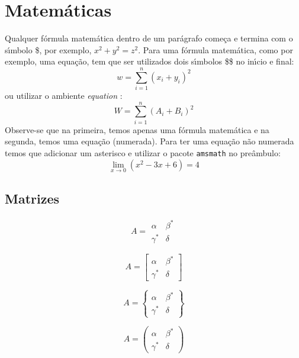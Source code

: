 




\section{Matem\'{a}ticas}
Qualquer f\'{o}rmula matem\'{a}tica dentro de um par\'{a}grafo come\c{c}a e termina com o s\'{\i}mbolo \$, por exemplo, $ x^2 + y^2 = z^2$. Para uma f\'{o}rmula matem\'{a}tica, como por exemplo, uma equa\c{c}\~{a}o, tem que ser utilizados dois s\'{\i}mbolos \$\$ no in\'{\i}cio e final:
$$
  w = \sum_{i=1}^{n} (x_{i}+y_{i})^{2}
$$
ou utilizar o ambiente \textit{equation}  :
\begin{equation}
  W = \sum_{i=1}^{n} (A_{i}+B_{i})^{2}
\end{equation}
Observe-se que na primeira, temos apenas uma f\'{o}rmula matem\'{a}tica e na segunda, temos uma equa\c{c}\~{a}o (numerada). Para ter uma equa\c{c}\~{a}o n\~{a}o numerada temos que adicionar um asterisco e utilizar o pacote {\tt amsmath} no pre\^{a}mbulo:
\begin{equation*}
  \lim_{x \to 0} (x^{2} - 3x + 6) = 4
\end{equation*}

	\subsection{Matrizes}
	$$
	A = \begin{matrix}
        	\alpha     & \beta^{*}\\
	        \gamma^{*} & \delta
	    \end{matrix}
	$$

	$$
	A = \begin{bmatrix}
	\alpha     & \beta^{*}\\
	\gamma^{*} & \delta
	\end{bmatrix}
	$$

	$$
	A = \begin{Bmatrix}
	\alpha     & \beta^{*}\\
	\gamma^{*} & \delta
	\end{Bmatrix}
	$$

	$$
	A = \begin{pmatrix}
	\alpha     & \beta^{*}\\
	\gamma^{*} & \delta
	\end{pmatrix}
	$$

